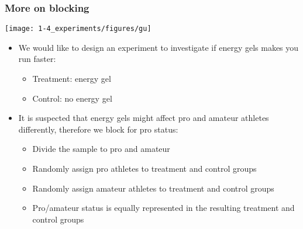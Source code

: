 \begin{frame}
\frametitle{More on blocking}


{
\begin{center}
\texttt{[image: 1-4\_experiments/figures/gu]}
\end{center}
}
{
\begin{itemize}
\item We would like to design an experiment to investigate if energy gels makes you run faster:

\pause

\begin{itemize}
\item Treatment: energy gel
\item Control: no energy gel
\end{itemize}

\pause

\item It is suspected that energy gels might affect pro and amateur athletes differently, therefore we block for pro status:

\pause

\begin{itemize}
\item Divide the sample to pro and amateur
\item Randomly assign pro athletes to treatment and control groups
\item Randomly assign amateur athletes to treatment and control groups
\item Pro/amateur status is equally represented in the resulting treatment and control groups
\end{itemize}
\end{itemize}
}

\pause


\end{frame}


